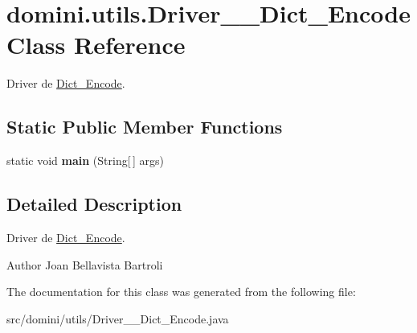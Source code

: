 \hypertarget{classdomini_1_1utils_1_1Driver____Dict__Encode}{}\section{domini.\+utils.\+Driver\+\_\+\+\_\+\+Dict\+\_\+\+Encode Class Reference}
\label{classdomini_1_1utils_1_1Driver____Dict__Encode}


Driver de \hyperlink{classdomini_1_1utils_1_1Dict__Encode}{Dict\+\_\+\+Encode}.  


\subsection*{Static Public Member Functions}
\begin{DoxyCompactItemize}
\item 
\mbox{\label{classdomini_1_1utils_1_1Driver____Dict__Encode_a67a9ab54d3335c433791b823d192ac8f}} 
static void {\bfseries main} (String\mbox{[}$\,$\mbox{]} args)
\end{DoxyCompactItemize}


\subsection{Detailed Description}
Driver de \hyperlink{classdomini_1_1utils_1_1Dict__Encode}{Dict\+\_\+\+Encode}. 

\begin{DoxyAuthor}{Author}
Joan Bellavista Bartroli 
\end{DoxyAuthor}


The documentation for this class was generated from the following file\+:\begin{DoxyCompactItemize}
\item 
src/domini/utils/Driver\+\_\+\+\_\+\+Dict\+\_\+\+Encode.\+java\end{DoxyCompactItemize}
